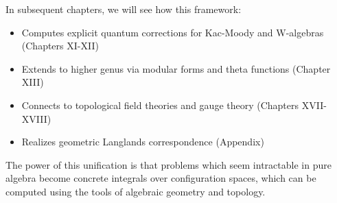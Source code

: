 \begin{remark}
In subsequent chapters, we will see how this framework:
\begin{itemize}
\item Computes explicit quantum corrections for Kac-Moody and W-algebras 
(Chapters XI-XII)
\item Extends to higher genus via modular forms and theta functions (Chapter XIII)
\item Connects to topological field theories and gauge theory (Chapters XVII-XVIII)
\item Realizes geometric Langlands correspondence (Appendix)
\end{itemize}

The power of this unification is that problems which seem intractable in pure algebra 
become concrete integrals over configuration spaces, which can be computed using 
the tools of algebraic geometry and topology.
\end{remark}

